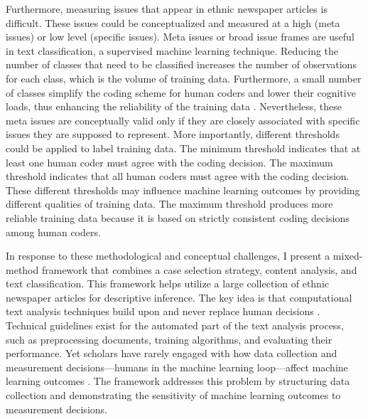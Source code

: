 Furthermore, measuring issues that appear in ethnic newspaper articles is difficult. These issues could be conceptualized and measured at a high (meta issues) or low level (specific issues). Meta issues or broad issue frames are useful in text classification, a supervised machine learning technique. Reducing the number of classes that need to be classified increases the number of observations for each class, which is the volume of training data. Furthermore, a small number of classes simplify the coding scheme for human coders and lower their cognitive loads, thus enhancing the reliability of the training data \citep{mikhaylov2012coder}. Nevertheless, these meta issues are conceptually valid only if they are closely associated with specific issues they are supposed to represent. More importantly, different thresholds could be applied to label training data. The minimum threshold indicates that at least one human coder must agree with the coding decision. The maximum threshold indicates that all human coders must agree with the coding decision. These different thresholds may influence machine learning outcomes by providing different qualities of training data. The maximum threshold produces more reliable training data because it is based on strictly consistent coding decisions among human coders. 

In response to these methodological and conceptual challenges, I present a mixed-method framework that combines a case selection strategy, content analysis, and text classification. This framework helps utilize a large collection of ethnic newspaper articles for descriptive inference. The key idea is that computational text analysis techniques build upon and never replace human decisions \citep[268]{grimmer2013text}. Technical guidelines exist for the automated part of the text analysis process, such as preprocessing documents, training algorithms, and evaluating their performance. Yet scholars have rarely engaged with how data collection and measurement decisions---humans in the machine learning loop---affect machine learning outcomes \citep{mikhaylov2012coder, gitelman2013raw, geiger2020garbage}. The framework addresses this problem by structuring data collection and demonstrating the sensitivity of machine learning outcomes to measurement decisions. 

